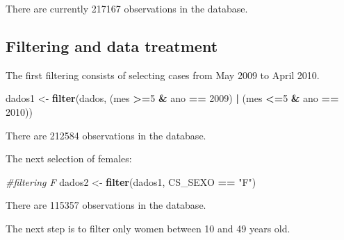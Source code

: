 \documentclass[
]{article}
\newenvironment{Shaded}{\begin{snugshade}}{\end{snugshade}}
\newcommand{\CommentTok}[1]{\textcolor[rgb]{0.56,0.35,0.01}{\textit{#1}}}
\newcommand{\DecValTok}[1]{\textcolor[rgb]{0.00,0.00,0.81}{#1}}
\newcommand{\KeywordTok}[1]{\textcolor[rgb]{0.13,0.29,0.53}{\textbf{#1}}}
\newcommand{\NormalTok}[1]{#1}
\newcommand{\OperatorTok}[1]{\textcolor[rgb]{0.81,0.36,0.00}{\textbf{#1}}}
\newcommand{\StringTok}[1]{\textcolor[rgb]{0.31,0.60,0.02}{#1}}
\begin{document}
There are currently 217167 observations in the database.

\hypertarget{filtering-and-data-treatment-1}{%
\subsection{Filtering and data
treatment}\label{filtering-and-data-treatment-1}}

The first filtering consists of selecting cases from May 2009 to April
2010.

\begin{Shaded}
\begin{Highlighting}[]
\NormalTok{dados1 <-}\StringTok{ }\KeywordTok{filter}\NormalTok{(dados, }
\NormalTok{                 (mes }\OperatorTok{>=}\DecValTok{5} \OperatorTok{&}\StringTok{ }\NormalTok{ano }\OperatorTok{==}\StringTok{ }\DecValTok{2009}\NormalTok{) }\OperatorTok{|}\StringTok{ }\NormalTok{(mes }\OperatorTok{<=}\DecValTok{5} \OperatorTok{&}\StringTok{ }\NormalTok{ano }\OperatorTok{==}\StringTok{ }\DecValTok{2010}\NormalTok{))}
\end{Highlighting}
\end{Shaded}

There are 212584 observations in the database.

The next selection of females:

\begin{Shaded}
\begin{Highlighting}[]
\CommentTok{#filtering F}
\NormalTok{dados2 <-}\StringTok{ }\KeywordTok{filter}\NormalTok{(dados1, CS_SEXO }\OperatorTok{==}\StringTok{ "F"}\NormalTok{)}
\end{Highlighting}
\end{Shaded}

There are 115357 observations in the database.

The next step is to filter only women between 10 and 49 years old.

\begin{Shaded}
\end{Shaded}
\end{document}

